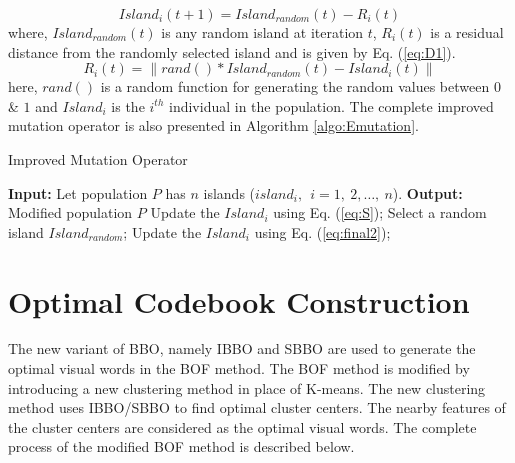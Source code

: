 \begin{equation}\label{eq:final2} 
Island_i(t+1)= Island_{random}(t)- R_i(t)
\end{equation}
where, $Island_{random}(t)$ is any random island at iteration $t$, $R_i(t)$ is a residual  distance from the randomly selected island and  is given by Eq. (\ref{eq:D1}).    
\begin{equation}\label{eq:D1}
R_i(t)= \| rand ()* Island_{random} (t)- Island_{i}(t)\|
\end{equation}
here, $rand()$ is a random function for generating the random values between $0$ \& $1$ and $Island_i$ is the $i^{th}$ individual in the population.
The complete improved mutation operator is also presented in Algorithm \ref{algo:Emutation}.
\begin{algorithm}
\caption{\fontsize{10pt}{12pt}\selectfont Improved Mutation Operator}
\label{algo:Emutation}
\footnotesize
\begin{algorithmic}
\STATE \textbf{Input:}  Let population $P$ has $n$ islands ($island_i,\ \ i=1,\ 2,\dots, \ n$).
\STATE \textbf{Output: } Modified population $P$
             \STATE Update the $Island_i$ using Eq. (\ref{eq:S});    
    \ELSE 
        \STATE Select a random island $Island_{random}$;
         \STATE Update the $Island_i$ using Eq. (\ref{eq:final2});
    \ENDIF
\ENDFOR    
\end{algorithmic}
\end{algorithm} 


\section{Optimal Codebook Construction}
The new variant of BBO, namely IBBO and SBBO are used to generate the optimal visual words in the BOF method. The BOF method is modified by introducing a new clustering method in place of K-means. The new clustering method uses IBBO/SBBO to find optimal cluster centers. The nearby features of the cluster centers are considered as the optimal visual words. The complete process of the modified BOF method is described below.


